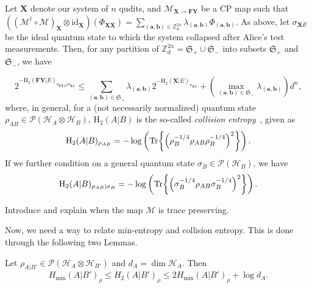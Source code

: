 \begin{lemma} 
\label{thm:entaglementSamplingResult}
Let $\mathbf{X}$ denote our system of  $n$ qudits, and  $\mathcal{M}_{\mathbf{X}\rightarrow \mathbf{F}\mathbf{Y}}$ be a CP map such that $((\mathcal{M}^\dagger \circ \mathcal{M})_{\mathbf{X}}\otimes \text{id}_{\bar{\mathbf{X}}})(\Phi_{\mathbf{X}\bar{\mathbf{X}}}) = \sum_{(\bm{a},\bm{b})\in\mathbb{Z}^{2n}_d} \lambda_{(\bm{a},\bm{b})} \Phi_{(\bm{a},\bm{b})}$. As above, let $\sigma_{\mathbf{X} E}$ be the ideal quantum state to which the system collapsed after Alice's test measurements.  Then, for any partition of $\mathbb{Z}^{2n}_d = \mathfrak{S}_+ \cup \mathfrak{S}_-$ into subsets $\mathfrak{S}_+$ and $\mathfrak{S}_-$, we have 

\begin{equation}
    2^{-\text{H}_2(\mathbf{F}\mathbf{Y} | E)_{\sigma_{\mathbf{F}\mathbf{Y}E} | \sigma_{\mathbf{X}E}}} \leq \sum_{(\bm{a},\bm{b})\in\mathfrak{S}_+} \lambda_{(\bm{a},\bm{b})} 2^{-\text{H}_2(\mathbf{X} | E)_{\sigma_{\mathbf{X}E}}} + (\max_{(\bm{a},\bm{b})\in\mathfrak{S}_-} \lambda_{(\bm{a},\bm{b})}) d^n,
\end{equation}
 where, in general, for a (not necessarily normalized) quantum state $\rho_{AB}\in \mathcal{P}(\mathcal{H}_A\otimes\mathcal{H}_B)$, $\text{H}_2(A|B)$   is the so-called \textit{collision entropy}~\cite{R06}, given as 
\begin{equation*} 
    \text{H}_2(A|B)_{\rho_{AB}}=-\log \left(\Tr{\left(\rho_{B}^{-1/4}\rho_{AB}\rho_B^{-1/4}\right)^2}\right).
\end{equation*}
If we further condition on a general quantum state $\sigma_B\in\mathcal{P}(\mathcal{H}_B)$, we have 
\begin{equation*}
    \text{H}_2(A|B)_{\rho_{AB}|\sigma_B}=-\log \left(\Tr{\left(\sigma_{B}^{-1/4}\rho_{AB}\sigma_B^{-1/4}\right)^2}\right).
\end{equation*}
\end{lemma}

Introduce and explain when the map $\mathcal{M}$ is trace preserving.

Now, we need a way to relate min-entropy and collision entropy. This is done through the following two Lemmas.

\begin{lemma}
Let $\rho_{A|B'}\in\mathcal{P}(\mathcal{H}_A \otimes \mathcal{H}_{B'})$ and $d_A = \dim\mathcal{H}_A$. Then
$$H_{\min}(A|B')_{\rho} \leq H_2(A|B')_{\rho} \leq 2 H_{\min}(A|B')_{\rho} + \log d_A.$$
\end{lemma}

